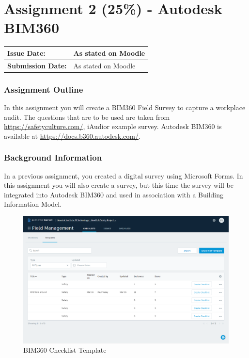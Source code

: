 
	
\part*{Assignment 2 (25\%) - Autodesk BIM360}

\begin{tabularx}{\textwidth}{ |X|X| }
	\hline
	\textbf{Issue Date:} & As stated on Moodle \\
	\hline 
	\textbf{Submission Date:}  & As stated on Moodle  \\
	\hline
\end{tabularx}


\section*{Assignment Outline}


In this assignment you will create a BIM360 Field Survey to capture a workplace audit.  The questions that are to be used are taken from \href{https://safetyculture.com/}{https://safetyculture.com/}, iAudior example survey.   Autodesk BIM360 is available at \href{https://docs.b360.autodesk.com/}{https://docs.b360.autodesk.com/}.


\section*{Background Information}

In a previous assignment, you created a digital survey using Microsoft Forms.  In this assignment you will also create a survey, but this time the survey will be integrated into Autodesk BIM360 and used in association with a Building Information Model.


\begin{figure}
	\centering
	\includegraphics[width=1.0\linewidth]{img/Template.png}
	\caption{BIM360 Checklist Template}
	\label{fig:BIM369ChecklistTemplate}
\end{figure}


